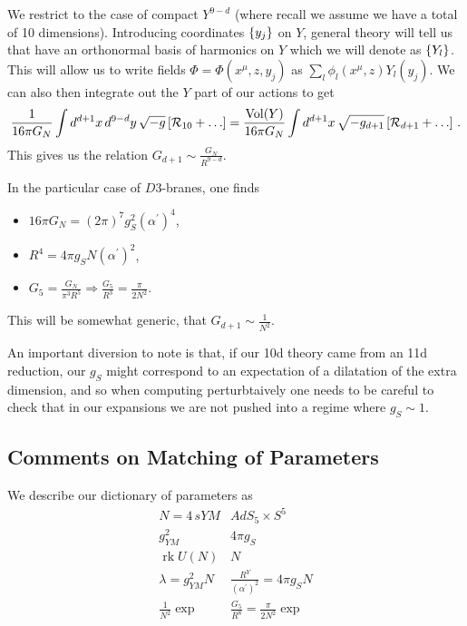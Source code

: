 \documentclass{article}
\begin{document}
We restrict to the case of compact $Y^{9-d}$ (where recall we assume we have a total of 10 dimensions). Introducing coordinates $\left\{ y_j \right\}$ on $Y$, general theory will tell us that have an orthonormal basis of harmonics on $Y$ which we will denote as $\left\{ Y_l \right\}$. This will allow us to write fields $\Phi = \Phi(x^\mu, z, y_j)$ as $\sum_l \phi_l(x^\mu,z) Y_l(y_j)$. We can also then integrate out the $Y$ part of our actions to get 
\[
\frac{1}{16 \pi G_N} \int d^{d+1}x \, d^{9-d}y \, \sqrt{-g} \psquare{\mc{R}_{10}+\dots} = \frac{\operatorname{Vol}(Y)}{16 \pi G_N} \int d^{d+1}x \, \sqrt{-g_{d+1}} \psquare{\mc{R}_{d+1} + \dots } \, .
\]
This gives us the relation $G_{d+1} \sim \frac{G_N}{R^{9-d}}$. 
\begin{example}
	In the particular case of $D3$-branes, one finds 
	\begin{itemize}
		\item $16 \pi G_N = (2 \pi)^7 g_S^2 (\alpha^\prime)^4$,
		\item $R^4 = 4 \pi g_S N (\alpha^\prime)^2$,
		\item $G_5 = \frac{G_N}{\pi^3 R^5} \Rightarrow \frac{G_5}{R^3} = \frac{\pi}{2 N^2}$. 
	\end{itemize}
This will be somewhat generic, that $G_{d+1} \sim \frac{1}{N^2}$. 
\end{example}

\begin{remark}
	An important diversion to note is that, if our 10d theory came from an 11d reduction, our $g_S$ might correspond to an expectation of a dilatation of the extra dimension, and so when computing perturbtaively one needs to be careful to check that in our expansions we are not pushed into a regime where $g_S \sim 1$.  
\end{remark}

\subsection{Comments on Matching of Parameters}
We describe our dictionary of parameters as 
\[
\begin{array}{c|c}
	N=4 \, sYM & AdS_5 \times S^5 \\ \hline \hline 
	g_{YM}^2 & 4 \pi g_S \\
	\operatorname{rk}U(N) & N \\
	\lambda = g_{YM}^2 N & \frac{R^Y}{(\alpha^\prime)^2}= 4 \pi g_S N \\
	\frac{1}{N^2} \exp & \frac{G_5}{R^8} = \frac{\pi}{2 N^2} \exp 
\end{array}
\]
\end{document}
